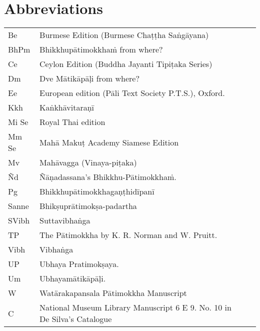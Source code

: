 
\chapter{Abbreviations}
\label{abbreviations}


\ifninebythirteenversion

\vspace{-0.6em}
\begin{tabular}{@{}llll@{}}
  Be & Burmese Edition (Burmese Chaṭṭha Saṅgāyana)\\
  BhPm & Bhikkhupātimokkhaṁ from where?\\
  Ce & Ceylon Edition (Buddha Jayanti Tipiṭaka Series)\\
  Dm & Dve Mātikāpāḷi from where?\\
  Ee & European edition (Pāli Text Society P.T.S.), Oxford.\\
  Kkh & Kaṅkhāvitaraṇī\\
  Mi Se & Royal Thai edition\\
  Mm Se & Mahā Makuṭ Academy Siamese Edition\\
  Mv & Mahāvagga (Vinaya-piṭaka)\\
  Ñd & Ñāṇadassana's Bhikkhu-Pātimokkhaṁ.\\
  Pg & Bhikkhupātimokkhagaṇṭhidīpanī\\
  Sanne & Bhikṣuprātimokṣa-padartha\\
  SVibh & Suttavibhaṅga\\
  TP & The Pātimokkha by K. R. Norman and W. Pruitt.\\
  Vibh & Vibhaṅga\\
  UP & Ubhaya Pratimokṣaya.\\
  Um & Ubhayamātikāpāḷi.\\
  W & Watärakapansala Pātimokkha Manuscript\\
  C & National Museum Library Manuscript 6 E 9. No. 10 in De Silva’s Catalogue\\
\end{tabular}

